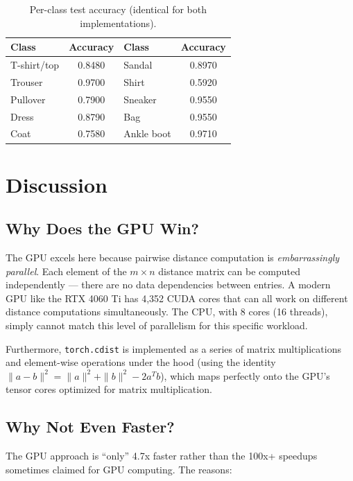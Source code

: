 \documentclass[11pt]{article}
\begin{document}
\begin{table}[H]
	\centering
	\caption{Per-class test accuracy (identical for both implementations).}
	\begin{tabular}{lclc}
		\toprule
		Class       & Accuracy & Class      & Accuracy \\
		\midrule
		T-shirt/top & 0.8480   & Sandal     & 0.8970   \\
		Trouser     & 0.9700   & Shirt      & 0.5920   \\
		Pullover    & 0.7900   & Sneaker    & 0.9550   \\
		Dress       & 0.8790   & Bag        & 0.9550   \\
		Coat        & 0.7580   & Ankle boot & 0.9710   \\
		\bottomrule
	\end{tabular}
\end{table}

\section{Discussion}

\subsection{Why Does the GPU Win?}

The GPU excels here because pairwise distance computation is \emph{embarrassingly parallel}. Each element of the $m \times n$ distance matrix can be computed independently --- there are no data dependencies between entries. A modern GPU like the RTX 4060 Ti has 4,352 CUDA cores that can all work on different distance computations simultaneously. The CPU, with 8 cores (16 threads), simply cannot match this level of parallelism for this specific workload.

Furthermore, \texttt{torch.cdist} is implemented as a series of matrix multiplications and element-wise operations under the hood (using the identity $\|a - b\|^2 = \|a\|^2 + \|b\|^2 - 2a^Tb$), which maps perfectly onto the GPU's tensor cores optimized for matrix multiplication.

\subsection{Why Not Even Faster?}

The GPU approach is ``only'' 4.7x faster rather than the 100x+ speedups sometimes claimed for GPU computing. The reasons:
\end{document}
